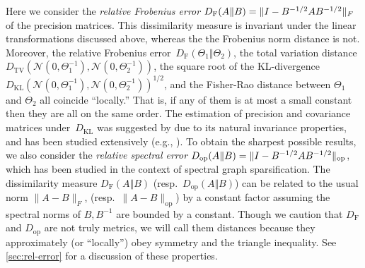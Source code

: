 \documentclass[aos]{imsart}
\theoremstyle{definition}
\numberwithin{equation}{section}
\DeclareMathOperator{\op}{op}
\DeclarePairedDelimiter{\norm}{\lVert}{\rVert}
\newcommand{\DF}{D_{\operatorname{F}}}
\newcommand{\Dop}{D_{\operatorname{op}}}
\newcommand{\DKL}{D_{\operatorname{KL}}}
\newcommand{\DTV}{D_{\operatorname{TV}}}
\begin{document}
Here we consider the \emph{relative Frobenius error} $\DF(A \Vert B) = \norm{I - B^{-1/2} A B^{-1/2}}_F$ of the precision matrices.
This dissimilarity measure is invariant under the linear transformations discussed above, whereas the the Frobenius norm distance is not.
Moreover, the relative Frobenius error~$\DF(\Theta_1 \Vert \Theta_2)$, the total variation distance $\DTV(\mathcal{N}(0, \Theta_1^{-1}), \mathcal{N}(0, \Theta_2^{-1}))$, the square root of the KL-divergence $\DKL(\mathcal{N}(0, \Theta_1^{-1}), \mathcal{N}(0, \Theta_2^{-1}))^{1/2}$, and the Fisher-Rao distance between $\Theta_1$ and $\Theta_2$ all coincide ``locally.''
That is, if any of them is at most a small constant then they are all on the same order.
The estimation of precision and covariance matrices under~$\DKL$ was suggested by \cite{james1992estimation} due to its natural invariance properties, and has been studied extensively (e.g., \cite{ledoit2012nonlinear}).
To obtain the sharpest possible results, we also consider the \emph{relative spectral error} $\Dop(A \Vert B) = \norm{I - B^{-1/2} A B^{-1/2}}_{\op}$, which has been studied in the context of spectral graph sparsification.
The dissimilarity measure $\DF(A\Vert B)$ (resp.\ $\Dop(A\Vert B)$) can be related to the usual norm $\|A - B\|_F$, (resp.\ $\|A - B\|_{\op}$) by a constant factor assuming the spectral norms of $B, B^{-1}$ are bounded by a constant.
Though we caution that $\DF$ and $\Dop$ are not truly metrics, we will call them distances because they approximately (or ``locally'') obey symmetry and the triangle inequality. See \cref{sec:rel-error} for a discussion of these properties.
\end{document}
